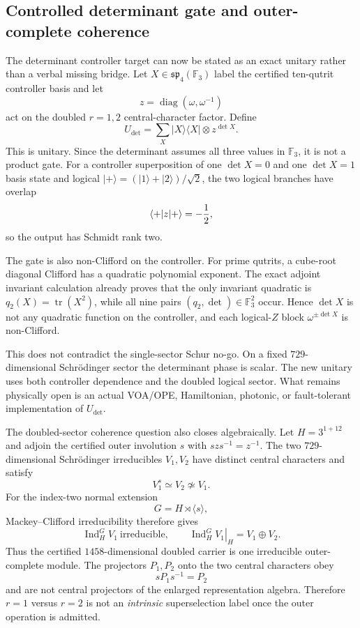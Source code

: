 \subsection{Controlled determinant gate and outer-complete coherence}
\label{sec:20260917-controlled-det-outer-coherence}

The determinant controller target can now be stated as an exact unitary rather
than a verbal missing bridge.  Let \(X\in\mathfrak{sp}_4(\mathbb F_3)\) label
the certified ten-qutrit controller basis and let
\[
z=\operatorname{diag}(\omega,\omega^{-1})
\]
act on the doubled \(r=1,2\) central-character factor.  Define
\[
\boxed{
U_{\det}=\sum_X |X\rangle\!\langle X|\otimes z^{\det X}.
}
\]
This is unitary.  Since the determinant assumes all three values in
\(\mathbb F_3\), it is not a product gate.  For a controller superposition of
one \(\det X=0\) and one \(\det X=1\) basis state and logical
\(|+\rangle=(|1\rangle+|2\rangle)/\sqrt2\), the two logical branches have
overlap
\[
\langle +|z|+\rangle=-{1\over2},
\]
so the output has Schmidt rank two.

The gate is also non-Clifford on the controller.  For prime qutrits, a
cube-root diagonal Clifford has a quadratic polynomial exponent.  The exact
adjoint invariant calculation already proves that the only invariant
quadratic is \(q_2(X)=\operatorname{tr}(X^2)\), while all nine pairs
\((q_2,\det)\in\mathbb F_3^2\) occur.  Hence \(\det X\) is not any quadratic
function on the controller, and each logical-\(Z\) block
\(\omega^{\pm\det X}\) is non-Clifford.

This does not contradict the single-sector Schur no-go.  On a fixed
\(729\)-dimensional Schr\"odinger sector the determinant phase is scalar.  The
new unitary uses both controller dependence and the doubled logical sector.
What remains physically open is an actual VOA/OPE, Hamiltonian, photonic, or
fault-tolerant implementation of \(U_{\det}\).

The doubled-sector coherence question also closes algebraically.  Let
\(H=3^{1+12}\) and adjoin the certified outer involution \(s\) with
\(szs^{-1}=z^{-1}\).  The two \(729\)-dimensional Schr\"odinger irreducibles
\(V_1,V_2\) have distinct central characters and satisfy
\[
V_1^s\simeq V_2\not\simeq V_1.
\]
For the index-two normal extension
\[
G=H\rtimes\langle s\rangle,
\]
Mackey--Clifford irreducibility therefore gives
\[
\boxed{\operatorname{Ind}_H^G V_1\ \text{irreducible},\qquad
\left.\operatorname{Ind}_H^G V_1\right|_H=V_1\oplus V_2.}
\]
Thus the certified \(1458\)-dimensional doubled carrier is one irreducible
outer-complete module.  The projectors \(P_1,P_2\) onto the two central
characters obey
\[
sP_1s^{-1}=P_2
\]
and are not central projectors of the enlarged representation algebra.
Therefore \(r=1\) versus \(r=2\) is not an \emph{intrinsic} superselection
label once the outer operation is admitted.

